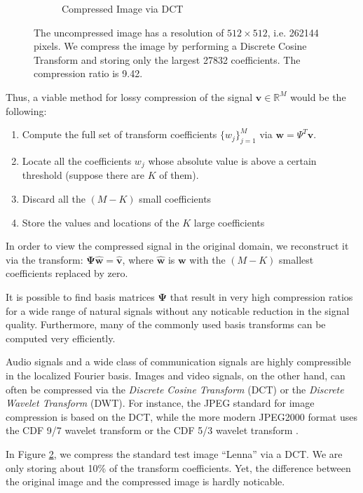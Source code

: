 \begin{figure}
\begin{subfigure}[b]{0.4\textwidth}
    \caption{Compressed Image via DCT}
    \label{fig:ch2:lenna_dct}
  \end{subfigure}
  \caption[Image Compression using DCT]{The uncompressed image has a resolution of $512\times 512$, i.e. 262144 pixels. We compress the image by performing a Discrete Cosine Transform and storing only the largest 27832 coefficients. The compression ratio is 9.42.}
  \label{fig:ch2:dct}
\end{figure}

Thus, a viable method for lossy compression of the signal $\bm v \in \mathbb{R}^M$ would be the following:
\begin{enumerate}
\item Compute the full set of transform coefficients $\{w_j\}_{j=1}^M$ via $\bm w = \Psi^T\bm v$.
\item Locate all the coefficients $w_j$ whose absolute value is above a certain threshold (suppose there are $K$ of them). 
\item Discard all the $(M-K)$ small coefficients
\item Store the values and locations of the $K$ large coefficients
\end{enumerate}
In order to view the compressed signal in the original domain, we reconstruct it via the transform: $\bm\Psi\bm{\hat w} = \bm{\hat v}$, where $\bm{\hat w}$ is $\bm w$ with the $(M-K)$ smallest coefficients replaced by zero.

It is possible to find basis matrices $\bm\Psi$ that result in very high compression ratios for a wide range of natural signals without any noticable reduction in the signal quality.
Furthermore, many of the commonly used basis transforms can be computed very efficiently.

Audio signals and a wide class of communication signals are highly compressible in the localized Fourier basis.
Images and video signals, on the other hand, can often be compressed via the \emph{Discrete Cosine Transform} (DCT) or the \emph{Discrete Wavelet Transform} (DWT).
For instance, the JPEG standard for image compression is based on the DCT, while the more modern JPEG2000 format uses the CDF 9/7 wavelet transform or the CDF 5/3 wavelet transform \cite{taubman2012}.

In Figure \ref{fig:ch2:dct}, we compress the standard test image ``Lenna'' via a DCT. 
We are only storing about 10\% of the transform coefficients.
Yet, the difference between the original image and the compressed image is hardly noticable.

